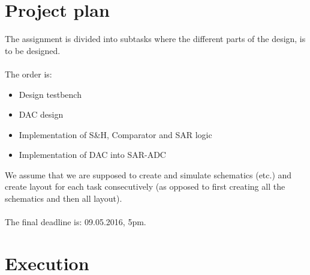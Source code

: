 \documentclass[english, 12pt, a4paper]{article}
\begin{document}
\section*{Project plan}
The assignment is divided into subtasks where the different parts of the design, is to be designed.\\
\\
The order is: 
\begin{itemize}
 \item Design testbench
 \item DAC design
 \item Implementation of S\&H, Comparator and SAR logic
 \item Implementation of DAC into SAR-ADC
\end{itemize}
We assume that we are supposed to create and simulate schematics (etc.) and create layout for each task consecutively (as opposed to first creating all the schematics and then all layout).\\
\\
The final deadline is: 09.05.2016, 5pm.

\section*{Execution}
\end{document}
